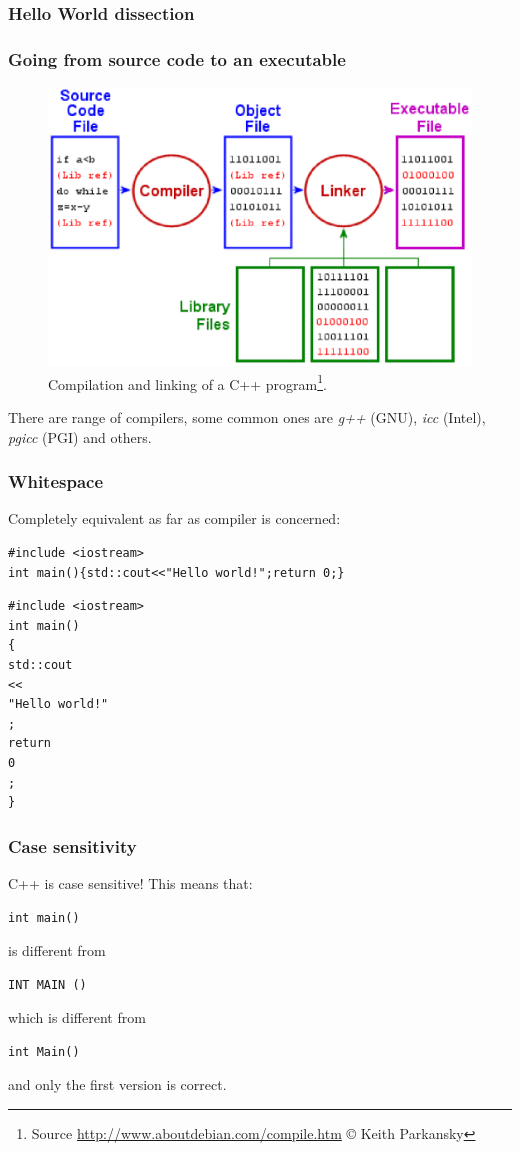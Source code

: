 \documentclass{beamer}
\begin{document}
\begin{frame}[fragile]
  \frametitle{Hello World dissection}
  \begin{semiverbatim}
  \end{semiverbatim}
\end{frame}

\begin{frame}
  \frametitle{Going from source code to an executable}
  
  \begin{figure}%
    \includegraphics[width=0.6\columnwidth]{figs/compile.eps}%
    \caption{Compilation and linking of a C++ program\footnote{Source \url{http://www.aboutdebian.com/compile.htm} \copyright{} Keith Parkansky}.}%
  \end{figure}
  \pause There are range of compilers, some common ones are \emph{g++} (GNU), \emph{icc} (Intel), \emph{pgicc} (PGI) and others. 

\end{frame}

\begin{frame}[fragile]
  \frametitle{Whitespace}
  \pause
  
  Completely equivalent as far as compiler is concerned:
  \begin{lstlisting}
#include <iostream>
int main(){std::cout<<"Hello world!";return 0;}
  \end{lstlisting}
  \begin{lstlisting}
#include <iostream>
int main()
{
std::cout
<<
"Hello world!"
;
return
0
;
}  \end{lstlisting}
\end{frame}

\begin{frame}[fragile]
  \frametitle{Case sensitivity}
  C++ is case sensitive!  This means that:
  \begin{lstlisting}
int main()
  \end{lstlisting}
  is different from
  \begin{lstlisting}
INT MAIN ()
  \end{lstlisting}
  which is different from
  \begin{lstlisting}
int Main()
  \end{lstlisting}
  and only the first version is correct.
\end{frame}
\end{document}
